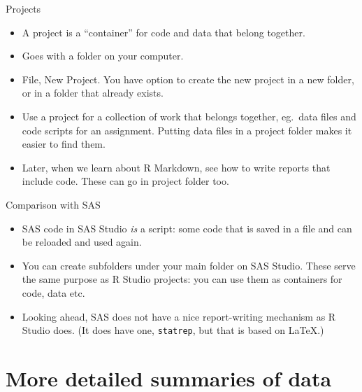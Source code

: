 \documentclass[unknownkeysallowed]{beamer}\usepackage[]{graphicx}\usepackage[]{color}
\begin{document}
\begin{frame}[fragile]{Projects}
  
  \begin{itemize}
  \item A project is a ``container'' for code and data that belong
    together.
  \item Goes with a folder on your computer.
  \item File, New Project. You have option to create the new project
    in a new folder, or in a folder that already exists.
  \item Use a project for a collection of work that belongs together,
    eg.\ data files and code scripts for an assignment. Putting data
    files in a project folder makes it easier to find them.
  \item Later, when we learn about R Markdown, see how to write
    reports that include code. These can go in project folder too.
  \end{itemize}
  
\end{frame}

\begin{frame}[fragile]{Comparison with SAS}
  
  \begin{itemize}
  \item SAS code in SAS Studio \emph{is} a script: some code that is
    saved in a file and can be reloaded and used again.
  \item You can create subfolders under your main folder on SAS
    Studio. These serve the same purpose as R Studio projects: you can
    use them as containers for code, data etc.
  \item Looking ahead, SAS does not have a nice report-writing
    mechanism as R Studio does. (It does have one, \texttt{statrep},
    but that is based on \LaTeX.)
  \end{itemize}
  
\end{frame}


\section{More detailed summaries of data}

\frame{\sectionpage}
\end{document}
